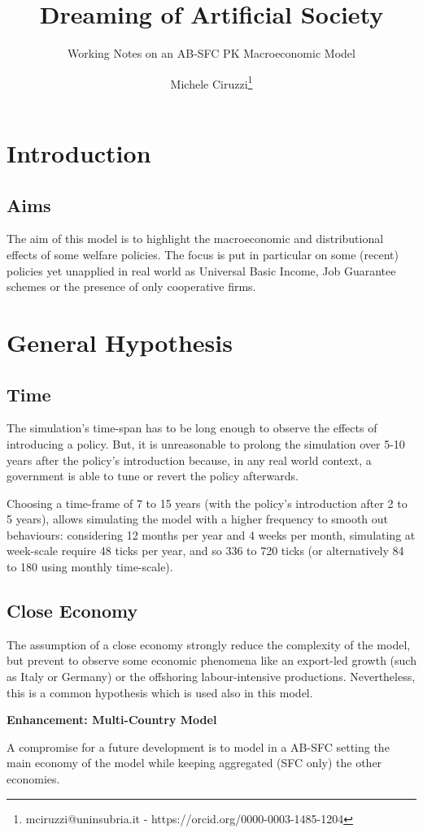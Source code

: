 \documentclass[a4paper, headings=standardclasses]{scrartcl}
\title{Dreaming of Artificial Society}
\subtitle{Working Notes on an AB-SFC PK Macroeconomic Model}
\author{Michele Ciruzzi\thanks{mciruzzi@uninsubria.it - https://orcid.org/0000-0003-1485-1204}}
\newenvironment{enh}[1][]{\begin{framed}\noindent\textbf{Enhancement: #1}\par}{\end{framed}}
\begin{document}
	
	\maketitle

	\tableofcontents

\section{Introduction}
\subsection{Aims}
The aim of this model is to highlight the macroeconomic and distributional effects of some welfare policies.  
The focus is put in particular on some (recent) policies yet unapplied in real world as Universal Basic Income, Job Guarantee schemes or the presence of only cooperative firms.

\section{General Hypothesis}
\subsection{Time}
The simulation's time-span has to be long enough to observe the effects of introducing a policy. But, it is unreasonable to prolong the simulation over 5-10 years after the policy's introduction because, in any real world context, a government is able to tune or revert the policy afterwards.

Choosing a time-frame of 7 to 15 years (with the policy's introduction after 2 to 5 years), allows simulating the model with a higher frequency to smooth out behaviours: considering 12 months per year and 4 weeks per month, simulating at week-scale require 48 ticks per year, and so 336 to 720 ticks (or alternatively 84 to 180 using monthly time-scale).

\subsection{Close Economy}
The assumption of a close economy strongly reduce the complexity of the model, but prevent to observe some economic phenomena like an export-led growth (such as Italy or Germany) or the offshoring labour-intensive productions.
Nevertheless, this is a common hypothesis which is used also in this model.

\begin{enh}[Multi-Country Model]
	A compromise for a future development is to model in a AB-SFC setting the main economy of the model while keeping aggregated (SFC only) the other economies.
\end{enh}
\end{document}
